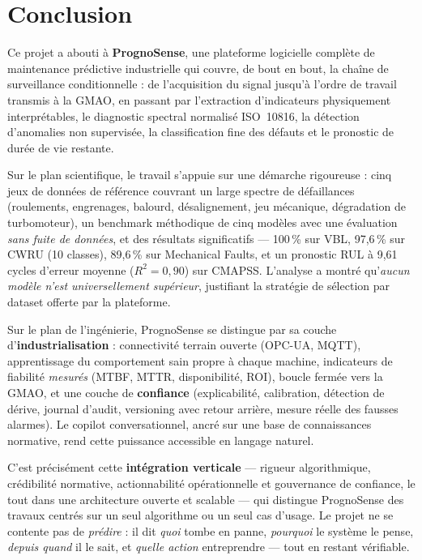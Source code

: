 \chapter{Conclusion}
\label{chap:conclusion}

Ce projet a abouti à \textbf{PrognoSense}, une plateforme logicielle complète de maintenance
prédictive industrielle qui couvre, de bout en bout, la chaîne de surveillance
conditionnelle : de l'acquisition du signal jusqu'à l'ordre de travail transmis à la GMAO,
en passant par l'extraction d'indicateurs physiquement interprétables, le diagnostic
spectral normalisé ISO~10816, la détection d'anomalies non supervisée, la classification
fine des défauts et le pronostic de durée de vie restante.

Sur le plan scientifique, le travail s'appuie sur une démarche rigoureuse : cinq jeux de
données de référence couvrant un large spectre de défaillances (roulements, engrenages,
balourd, désalignement, jeu mécanique, dégradation de turbomoteur), un benchmark méthodique
de cinq modèles avec une évaluation \emph{sans fuite de données}, et des résultats
significatifs --- 100\,\% sur VBL, 97{,}6\,\% sur CWRU (10 classes), 89{,}6\,\% sur
Mechanical Faults, et un pronostic RUL à 9{,}61 cycles d'erreur moyenne ($R^2 = 0{,}90$) sur
CMAPSS. L'analyse a montré qu'\emph{aucun modèle n'est universellement supérieur}, justifiant
la stratégie de sélection par dataset offerte par la plateforme.

Sur le plan de l'ingénierie, PrognoSense se distingue par sa couche d'\textbf{industrialisation}
: connectivité terrain ouverte (OPC-UA, MQTT), apprentissage du comportement sain propre à
chaque machine, indicateurs de fiabilité \emph{mesurés} (MTBF, MTTR, disponibilité, ROI),
boucle fermée vers la GMAO, et une couche de \textbf{confiance} (explicabilité, calibration,
détection de dérive, journal d'audit, versioning avec retour arrière, mesure réelle des
fausses alarmes). Le copilot conversationnel, ancré sur une base de connaissances normative,
rend cette puissance accessible en langage naturel.

C'est précisément cette \textbf{intégration verticale} --- rigueur algorithmique,
crédibilité normative, actionnabilité opérationnelle et gouvernance de confiance, le tout
dans une architecture ouverte et scalable --- qui distingue PrognoSense des travaux centrés
sur un seul algorithme ou un seul cas d'usage. Le projet ne se contente pas de
\emph{prédire} : il dit \emph{quoi} tombe en panne, \emph{pourquoi} le système le pense,
\emph{depuis quand} il le sait, et \emph{quelle action} entreprendre --- tout en restant
vérifiable.

